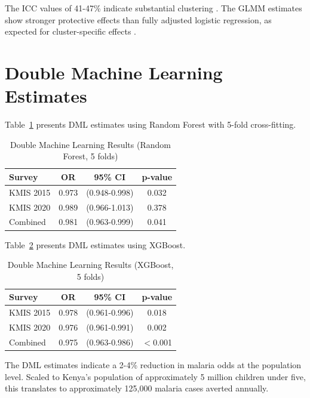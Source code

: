 The ICC values of 41-47\% indicate substantial clustering \citep{killip2004intracluster}. The GLMM estimates show stronger protective effects than fully adjusted logistic regression, as expected for cluster-specific effects \citep{neuhaus1991comparison}.

\section{Double Machine Learning Estimates}

Table~\ref{tab:dml} presents DML estimates using Random Forest with 5-fold cross-fitting.

\begin{table}[htbp]
	\centering
	\caption{Double Machine Learning Results (Random Forest, 5 folds)}
	\label{tab:dml}
	\begin{tabular}{@{}lccc@{}}
		\toprule
		\textbf{Survey} & \textbf{OR} & \textbf{95\% CI} & \textbf{p-value} \\
		\midrule
		KMIS 2015 & 0.973 & (0.948-0.998) & 0.032 \\
		KMIS 2020 & 0.989 & (0.966-1.013) & 0.378 \\
		Combined & 0.981 & (0.963-0.999) & 0.041 \\
		\bottomrule
	\end{tabular}
\end{table}

Table~\ref{tab:dml_xgb} presents DML estimates using XGBoost.

\begin{table}[htbp]
	\centering
	\caption{Double Machine Learning Results (XGBoost, 5 folds)}
	\label{tab:dml_xgb}
	\begin{tabular}{@{}lccc@{}}
		\toprule
		\textbf{Survey} & \textbf{OR} & \textbf{95\% CI} & \textbf{p-value} \\
		\midrule
		KMIS 2015 & 0.978 & (0.961-0.996) & 0.018 \\
		KMIS 2020 & 0.976 & (0.961-0.991) & 0.002 \\
		Combined & 0.975 & (0.963-0.986) & $<$0.001 \\
		\bottomrule
	\end{tabular}
\end{table}

The DML estimates indicate a 2-4\% reduction in malaria odds at the population level. Scaled to Kenya's population of approximately 5 million children under five, this translates to approximately 125,000 malaria cases averted annually.

